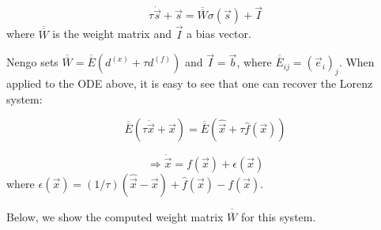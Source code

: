 \documentclass{report}
\begin{document}
\[ \tau  \dot{\vec s} + \vec s =\overline{\overline{W}} \sigma(\vec s) + \vec I \]
where \(\overline{\overline{W}}\) is the weight matrix and \(\vec I\) a
bias vector.

Nengo sets
\(\overline{\overline{W}} = \overline{\overline{E}} (d^{(x)} + \tau d^{(f)})\)
and \(\vec I = \vec b\), where
\(\overline{\overline{E}}_{ij} = (\vec e_i)_j\). When applied to the ODE
above, it is easy to see that one can recover the Lorenz system:

\[
\overline{\overline{E}} (\tau  \dot{\vec x} + \vec x) = \overline{\overline{E}} (\hat{\vec x} + \tau \hat{f}(\vec x))
\]

\[
\Longrightarrow \dot{\vec x} = f(\vec x) + \epsilon(\vec x)
\] where
\(\epsilon(\vec x) = (1/\tau) (\hat{\vec x} - \vec x) + \hat{f}(\vec x) - f(\vec x)\).

Below, we show the computed weight matrix \(\overline{\overline{W}}\)
for this system.

    \begin{center}
    \end{center}
    { \hspace*{\fill} \\}






    
\end{document}
